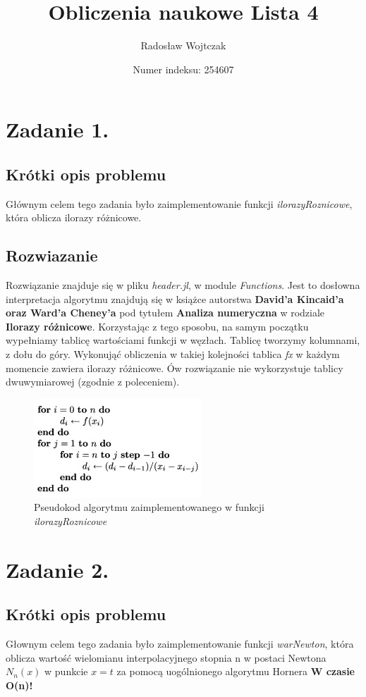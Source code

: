 \documentclass[a4paper,14pt]{report}
\title{Obliczenia naukowe Lista 4}
\author{Radosław Wojtczak}
\date{Numer indeksu: 254607}
\begin{document}
\maketitle
\tableofcontents
\chapter{Zadanie 1.}
  \section{Krótki opis problemu}
    Głównym celem tego zadania było zaimplementowanie funkcji \textit{ilorazyRoznicowe}, która oblicza ilorazy różnicowe.
  \section{Rozwiazanie}
    Rozwiązanie znajduje się w pliku \textit{header.jl}, w module \textit{Functions}. Jest to dosłowna interpretacja algorytmu znajdują się w książce 
    autorstwa \textbf{David'a Kincaid'a oraz Ward'a Cheney'a} pod tytułem \textbf{Analiza numeryczna} w rodziale \textbf{Ilorazy różnicowe}. Korzystając z tego sposobu, na samym początku wypełniamy tablicę wartościami funkcji w węzłach. Tablicę tworzymy kolumnami, z dołu do góry. Wykonująć obliczenia w takiej kolejności tablica \textit{fx} w każdym momencie zawiera ilorazy różnicowe. Ów rozwiązanie nie wykorzystuje tablicy dwuwymiarowej (zgodnie z poleceniem).
    \begin{figure}[H]
    \includegraphics[scale=1.0]{Kincaid}
    \centering
    \caption{Pseudokod algorytmu zaimplementowanego w funkcji \textit{ilorazyRoznicowe}}
  \end{figure}
\chapter{Zadanie 2.}
  \section{Krótki opis problemu}
    Głownym celem tego zadania było zaimplementowanie funkcji \textit{warNewton}, która oblicza wartość wielomianu interpolacyjnego stopnia n w postaci Newtona $N_{n}(x)$ w punkcie $x=t$ za pomocą uogólnionego algorytmu Hornera \textbf{W czasie O(n)!}
\end{document}
